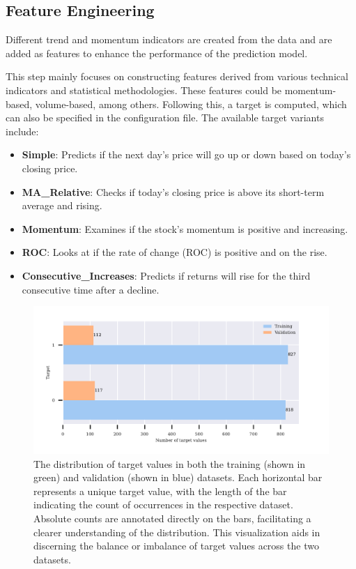 \FloatBarrier %
\subsection{Feature Engineering}
Different trend and momentum indicators are created from the data and are added as features to enhance the performance of the prediction model.

This step mainly focuses on constructing features derived from various technical indicators and statistical methodologies. These features could be momentum-based, volume-based, among others. Following this, a target is computed, which can also be specified in the configuration file. The available target variants include:
\begin{itemize}
    \item \textbf{Simple}: Predicts if the next day's price will go up or down based on today's closing price.
    \item \textbf{MA\_Relative}: Checks if today's closing price is above its short-term average and rising.
    \item \textbf{Momentum}: Examines if the stock's momentum is positive and increasing.
    \item \textbf{ROC}: Looks at if the rate of change (ROC) is positive and on the rise.
    \item \textbf{Consecutive\_Increases}: Predicts if returns will rise for the third consecutive time after a decline.
\end{itemize}


\begin{figure}[h]
\centering
\begin{adjustbox}{max width=1\textwidth,center}
    \includegraphics[scale=1]{./pdf/report/sig_distr.pdf}
\end{adjustbox}
    \caption{The distribution of target values in both the training (shown in green) and validation (shown in blue) datasets. Each horizontal bar represents a unique target value, with the length of the bar indicating the count of occurrences in the respective dataset. Absolute counts are annotated directly on the bars, facilitating a clearer understanding of the distribution. This visualization aids in discerning the balance or imbalance of target values across the two datasets.}
\label{fig:signal_distribution}
\end{figure}

